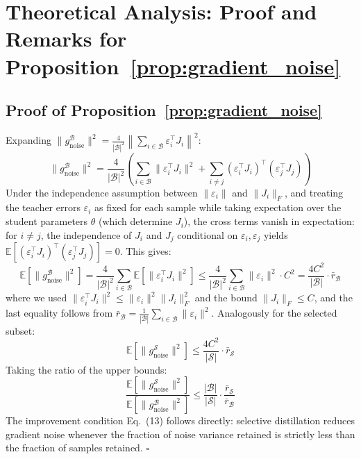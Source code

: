 \section{Theoretical Analysis: Proof and Remarks for Proposition~\ref{prop:gradient_noise}}
\label{sec:appendix_proof}
\label{sec:appendix_remarks}
\label{sec:appendix_theory}

\subsection{Proof of Proposition~\ref{prop:gradient_noise}}

Expanding $\|g^{\mathcal{B}}_{\text{noise}}\|^2 = \frac{4}{|\mathcal{B}|^2}\left\|\sum_{i \in \mathcal{B}} \varepsilon_i^\top J_i\right\|^2$:
\begin{equation}
\|g^{\mathcal{B}}_{\text{noise}}\|^2 = \frac{4}{|\mathcal{B}|^2}\left(\sum_{i \in \mathcal{B}} \|\varepsilon_i^\top J_i\|^2 + \sum_{i \neq j} (\varepsilon_i^\top J_i)^\top (\varepsilon_j^\top J_j)\right)
\end{equation}
Under the independence assumption between $\|\varepsilon_i\|$ and $\|J_i\|_F$, and treating the teacher errors $\varepsilon_i$ as fixed for each sample while taking expectation over the student parameters $\theta$ (which determine $J_i$), the cross terms vanish in expectation: for $i \neq j$, the independence of $J_i$ and $J_j$ conditional on $\varepsilon_i, \varepsilon_j$ yields $\mathbb{E}[(\varepsilon_i^\top J_i)^\top (\varepsilon_j^\top J_j)] = 0$. This gives:
\begin{equation}
\mathbb{E}[\|g^{\mathcal{B}}_{\text{noise}}\|^2] = \frac{4}{|\mathcal{B}|^2}\sum_{i \in \mathcal{B}} \mathbb{E}[\|\varepsilon_i^\top J_i\|^2] \leq \frac{4}{|\mathcal{B}|^2}\sum_{i \in \mathcal{B}} \|\varepsilon_i\|^2 \cdot C^2 = \frac{4C^2}{|\mathcal{B}|} \cdot \bar{r}_{\mathcal{B}}
\end{equation}
where we used $\|\varepsilon_i^\top J_i\|^2 \leq \|\varepsilon_i\|^2 \|J_i\|_F^2$ and the bound $\|J_i\|_F \leq C$, and the last equality follows from $\bar{r}_{\mathcal{B}} = \frac{1}{|\mathcal{B}|}\sum_{i \in \mathcal{B}} \|\varepsilon_i\|^2$. Analogously for the selected subset:
\begin{equation}
\mathbb{E}[\|g^{\mathcal{S}}_{\text{noise}}\|^2] \leq \frac{4C^2}{|\mathcal{S}|} \cdot \bar{r}_{\mathcal{S}}
\end{equation}
Taking the ratio of the upper bounds:
\begin{equation}
\frac{\mathbb{E}[\|g^{\mathcal{S}}_{\text{noise}}\|^2]}{\mathbb{E}[\|g^{\mathcal{B}}_{\text{noise}}\|^2]} \leq \frac{|\mathcal{B}|}{|\mathcal{S}|} \cdot \frac{\bar{r}_{\mathcal{S}}}{\bar{r}_{\mathcal{B}}}
\end{equation}
The improvement condition Eq.~(13) follows directly: selective distillation reduces gradient noise whenever the fraction of noise variance retained is strictly less than the fraction of samples retained. $\square$

